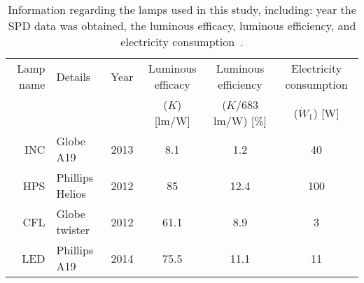 

\begin{table}
\centering %
\caption{Information regarding the lamps used in this study, including: 
year the SPD data was obtained, 
the luminous efficacy, 
luminous efficiency, and 
electricity consumption~\cite{aube2013}.}
\begin{tabular}{r l c c c c}
  \toprule
  Lamp name 
      & Details 
      & Year
      & Luminous efficacy 
      & Luminous efficiency
      & Electricity consumption \\
  
      &
      &
      & ($K$) [lm/W]
      & ($K$/683 lm/W) [\%]
      & ($\dot{W}_1$) [W] \\
  \midrule
  INC
      & Globe A19
      & 2013
      & 8.1
      & 1.2
      & 40 \\
  HPS   
      & Phillips Helios
      & 2012
      & 85
      & 12.4
      & 100 \\
  CFL
      & Globe twister
      & 2012
      & 61.1
      & 8.9
      & 3 \\
  LED
      & Phillips A19
      & 2014
      & 75.5
      & 11.1
      & 11 \\
  \bottomrule
\end{tabular}
\label{tab:lamps}
\end{table}

